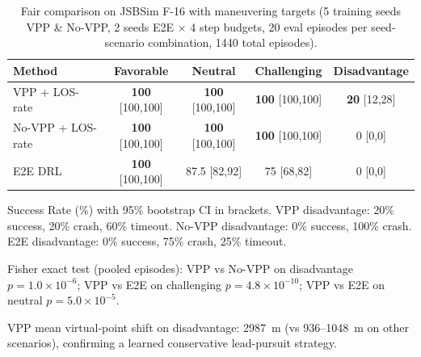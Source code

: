 \begin{table}[t]
\centering
\small
\caption{Fair comparison on JSBSim F-16 with maneuvering targets
(5 training seeds VPP \& No-VPP, 2 seeds E2E $\times$ 4 step budgets, 20 eval episodes per seed-scenario combination, 1440 total episodes).}
\label{tab:jsbsim_fair}
\begin{tabular}{@{}lcccc@{}}
\toprule
Method & Favorable & Neutral & Challenging & Disadvantage \\
\midrule
VPP + LOS-rate   & \textbf{100} [100,100] & \textbf{100} [100,100] & \textbf{100} [100,100] & \textbf{20} [12,28] \\
No-VPP + LOS-rate & \textbf{100} [100,100] & \textbf{100} [100,100] & \textbf{100} [100,100] & 0 [0,0] \\
E2E DRL           & \textbf{100} [100,100] & 87.5 [82,92] & 75 [68,82] & 0 [0,0] \\
\bottomrule
\end{tabular}
\begin{tablenotes}
\small
\item Success Rate (\%) with 95\% bootstrap CI in brackets. VPP disadvantage: 20\% success, 20\% crash, 60\% timeout. No-VPP disadvantage: 0\% success, 100\% crash. E2E disadvantage: 0\% success, 75\% crash, 25\% timeout.
\item Fisher exact test (pooled episodes): VPP vs No-VPP on disadvantage $p = 1.0 \times 10^{-6}$; VPP vs E2E on challenging $p = 4.8 \times 10^{-10}$; VPP vs E2E on neutral $p = 5.0 \times 10^{-5}$.
\item VPP mean virtual-point shift on disadvantage: 2987~m (vs 936--1048~m on other scenarios), confirming a learned conservative lead-pursuit strategy.
\end{tablenotes}
\end{table}
